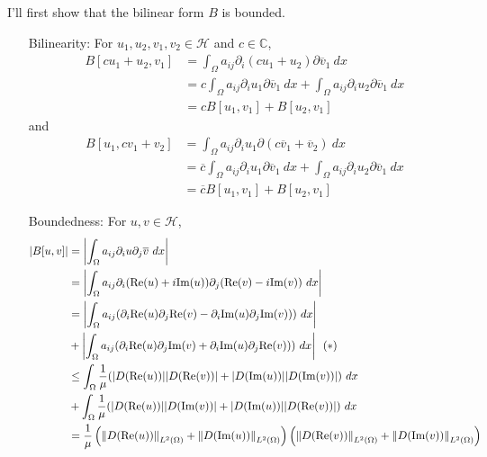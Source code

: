 \documentclass{article}
\begin{document}
\begin{enumerate}
I'll first show that the bilinear form $B$ is bounded.
\begin{enumerate}
\item[Bilinearity:] For $u_1,u_2,v_1,v_2\in \mathcal{H}$ and $c\in \mathbb{C}$,
\begin{equation*}
\begin{split}
B[cu_1+u_2,v_1]&=\int_\Omega a_{ij}\partial_i (cu_1+u_2)\partial \overline{v}_1~dx \\
&=c\int_\Omega a_{ij}\partial_i u_1\partial \overline{v}_1~dx+\int_\Omega a_{ij}\partial_i u_2\partial \overline{v}_1~dx \\
&=cB[u_1,v_1]+B[u_2,v_1]
\end{split}
\end{equation*}
and
\begin{equation*}
\begin{split}
B[u_1,cv_1+v_2]&=\int_\Omega a_{ij}\partial_i u_1\partial (c\overline{v}_1+\overline{v}_2)~dx \\
&=\overline{c}\int_\Omega a_{ij}\partial_i u_1\partial \overline{v}_1~dx+\int_\Omega a_{ij}\partial_i u_2\partial \overline{v}_1~dx \\
&=\overline{c}B[u_1,v_1]+B[u_2,v_1]
\end{split}
\end{equation*}
\item[Boundedness:]  For $u,v\in \mathcal{H}$,
\begin{equation*}
\begin{split}
\abs{B[u,v]}&=\abs{\int_\Omega a_{ij}\partial_i u\partial_j \overline{v}~dx} \\
&=\abs{\int_\Omega a_{ij}\partial_i (\text{Re}(u)+i\text{Im}(u))\partial_j (\text{Re}(v)-i\text{Im}(v))~dx} \\
&=\abs{\int_\Omega a_{ij} (\partial_i\text{Re}(u)\partial_j\text{Re}(v)-\partial_i\text{Im}(u)\partial_j\text{Im}(v)))~dx}\\
&+\abs{\int_\Omega a_{ij} (\partial_i\text{Re}(u)\partial_j\text{Im}(v)+\partial_i\text{Im}(u)\partial_j\text{Re}(v)))~dx}~~(*)\\
&\leq\int_\Omega \frac{1}{\mu} (\abs{D(\text{Re}(u))}\abs{D(\text{Re}(v))}+\abs{D(\text{Im}(u))}\abs{D(\text{Im}(v))})~dx\\
&+\int_\Omega \frac{1}{\mu} (\abs{D(\text{Re}(u))}\abs{D(\text{Im}(v))}+\abs{D(\text{Im}(u))}\abs{D(\text{Re}(v))})~dx\\
&=\frac{1}{\mu}\left(\norm{D(\text{Re}(u))}_{L^2(\Omega)}+\norm{D(\text{Im}(u))}_{L^2(\Omega)}\right)\left(\norm{D(\text{Re}(v))}_{L^2(\Omega)}+\norm{D(\text{Im}(v))}_{L^2(\Omega)}\right) \\

\end{split}
\end{equation*}
\end{enumerate}
\end{enumerate}
\end{document}
